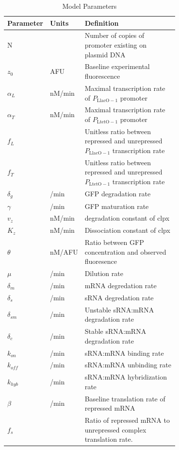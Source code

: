 \documentclass[10pt,journal]{./IEEE_latex_class/IEEEtran}
\begin{document}
\begin{table}[h]
\renewcommand{\arraystretch}{1.3}
\caption{Model Parameters}
\label{ModelParameters}
\centering
\begin{tabular}{| l | l | p{0.7\linewidth} |}
\hline \textbf{Parameter} &  \textbf{Units} & \textbf{Definition}  \\
\hline \hline N & & Number of copies of promoter existing on plasmid DNA  \\
\hline $z_{0}$ &  AFU & Baseline experimental fluorescence  \\
\hline $\alpha_{L}$ & nM/min & Maximal transcription rate of $P_\mathrm{LlacO-1}$ promoter\\
\hline $\alpha_{T}$  &  nM/min  & Maximal transcription rate of $P_{\mathrm{LtetO-1}}$ promoter \\
\hline $f_{L}$ &  & Unitless ratio between repressed and unrepressed $P_\mathrm{LlacO-1}$ transcription rate   \\ 
\hline $f_{T}$ &  & Unitless ratio between repressed and unrepressed $P_{\mathrm{LtetO-1}}$ transcription rate  \\
\hline $\delta_{g}$  & /min  & GFP degradation rate  \\
\hline $\gamma$ &  /min & GFP maturation rate  \\
\hline $v_{z}$ & nM/min & degradation constant of clpx  \\
\hline $K_{z}$   &   nM/min & Dissociation constant of clpx  \\
\hline $\theta$  &   nM/AFU & Ratio between GFP concentration and observed fluoresence  \\
\hline $\mu$ &  /min & Dilution rate  \\
\hline $\delta_{m}$ &  /min & mRNA degredation rate  \\
\hline $\delta_{s}$ &  /min & sRNA degredation rate  \\
\hline $\delta_{sm}$ &  /min & Unstable sRNA:mRNA degradation rate  \\
\hline $\delta_{c}$ &  /min & Stable sRNA:mRNA degradation rate  \\
\hline $k_{on}$ &   /min & sRNA:mRNA binding rate \\
\hline $k_{off}$ &  /min & sRNA:mRNA unbinding rate \\
\hline $k_{hyb}$ &  /min & sRNA:mRNA hybridization rate \\
\hline $\beta$ &   /min & Baseline translation rate of repressed mRNA \\
\hline $f_{s}$ & & Ratio of repressed mRNA to unrepressed complex translation rate. \\
\hline
\end{tabular}
\end{table}
\end{document}
